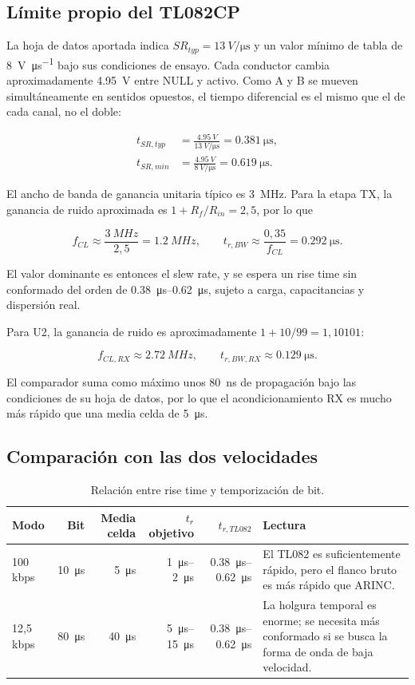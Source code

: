 \documentclass[11pt,a4paper]{article}
\begin{document}
\subsection{Límite propio del TL082CP}

La hoja de datos aportada indica $SR_{typ}=\SI{13}{V\per\micro\second}$ y un
valor mínimo de tabla de \SI{8}{V\per\micro\second} bajo sus condiciones de
ensayo. Cada conductor cambia aproximadamente \SI{4.95}{V} entre NULL y activo.
Como A y B se mueven simultáneamente en sentidos opuestos, el tiempo diferencial
es el mismo que el de cada canal, no el doble:

\begin{align*}
 t_{SR,typ}&=\frac{\SI{4.95}{V}}
 {\SI{13}{V\per\micro\second}}=\SI{0.381}{\micro\second},\\
 t_{SR,min}&=\frac{\SI{4.95}{V}}
 {\SI{8}{V\per\micro\second}}=\SI{0.619}{\micro\second}.
\end{align*}

El ancho de banda de ganancia unitaria típico es \SI{3}{MHz}. Para la etapa TX,
la ganancia de ruido aproximada es $1+R_f/R_{in}=2{,}5$, por lo que

\[
 f_{CL}\approx\frac{\SI{3}{MHz}}{2{,}5}=\SI{1.2}{MHz},\qquad
 t_{r,BW}\approx\frac{0{,}35}{f_{CL}}=\SI{0.292}{\micro\second}.
\]

El valor dominante es entonces el slew rate, y se espera un rise time sin
conformado del orden de \SIrange{0.38}{0.62}{\micro\second}, sujeto a carga,
capacitancias y dispersión real.

Para U2, la ganancia de ruido es aproximadamente
$1+10/99=1{,}10101$:

\[
 f_{CL,RX}\approx\SI{2.72}{MHz},\qquad
 t_{r,BW,RX}\approx\SI{0.129}{\micro\second}.
\]

El comparador suma como máximo unos \SI{80}{ns} de propagación bajo las
condiciones de su hoja de datos, por lo que el acondicionamiento RX es mucho más
rápido que una media celda de \SI{5}{\micro\second}.

\subsection{Comparación con las dos velocidades}

\begin{table}[h]
\centering
\caption{Relación entre rise time y temporización de bit.}
\begin{tabularx}{\textwidth}{@{}lrrrrX@{}}
\toprule
Modo & Bit & Media celda & $t_r$ objetivo & $t_{r,TL082}$ & Lectura \\
\midrule
100 kbps & \SI{10}{\micro\second} & \SI{5}{\micro\second} & \SIrange{1}{2}{\micro\second} & \SIrange{0.38}{0.62}{\micro\second} & El TL082 es suficientemente rápido, pero el flanco bruto es más rápido que ARINC. \\
12,5 kbps & \SI{80}{\micro\second} & \SI{40}{\micro\second} & \SIrange{5}{15}{\micro\second} & \SIrange{0.38}{0.62}{\micro\second} & La holgura temporal es enorme; se necesita más conformado si se busca la forma de onda de baja velocidad. \\
\bottomrule
\end{tabularx}
\end{table}
\end{document}
